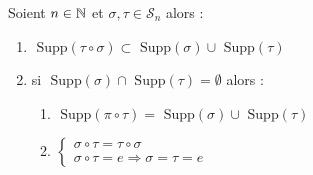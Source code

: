 \begin{prop}
	Soient $ n \in \mathbb{N}$ et $\sigma,\tau \in \mathcal{S}_n$ alors :
	\begin{enumerate}
		\item $ \text{ Supp} (\tau \circ \sigma) \subset \text{ Supp}(\sigma) \cup \text{ Supp}(\tau)$
		\item si $\text{ Supp}(\sigma) \cap \text{ Supp}(\tau) = \emptyset$ alors :
				\begin{enumerate}
						\item $\text{ Supp}(\pi \circ \tau) = \text{ Supp}(\sigma) \cup \text{ Supp}(\tau)$ 
						\item $
							\begin{cases}
			   					\sigma \circ \tau = \tau \circ \sigma \\
								\sigma \circ \tau = e \Longrightarrow \sigma = \tau = e
							\end{cases} $
				\end{enumerate}
	\end{enumerate}
\end{prop}

